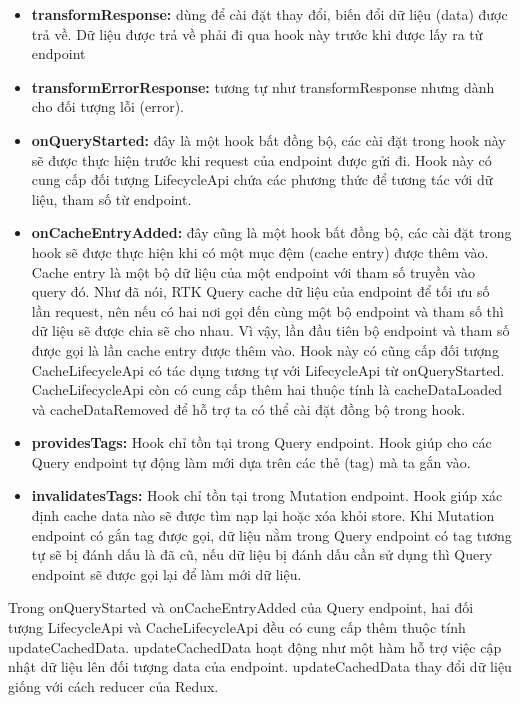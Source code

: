 \begin{itemize}
  \item \textbf{transformResponse:} dùng để cài đặt thay đổi, biến đổi dữ liệu (data) được trả về.
        Dữ liệu được trả về phải đi qua hook này trước khi được lấy ra từ endpoint
  \item \textbf{transformErrorResponse:} tương tự như transformResponse nhưng dành cho đối tượng lỗi (error).
  \item \textbf{onQueryStarted:} đây là một hook bất đồng bộ, các cài đặt trong hook này sẽ được thực hiện trước khi request của endpoint được gửi đi. Hook này có cung cấp đối tượng LifecycleApi chứa các phương thức để tương tác với dữ liệu, tham số từ endpoint.
  \item \textbf{onCacheEntryAdded:} đây cũng là một hook bất đồng bộ, các cài đặt trong hook sẽ được thực hiện khi có một mục đệm (cache entry) được thêm vào.
        Cache entry là một bộ dữ liệu của một endpoint với tham số truyền vào query đó.
        Như đã nói, RTK Query cache dữ liệu của endpoint để tối ưu số lần request, nên nếu có hai nơi gọi đến cùng một bộ endpoint và tham số thì dữ liệu sẽ được chia sẽ cho nhau.
        Vì vậy, lần đầu tiên bộ endpoint và tham số được gọi là lần cache entry được thêm vào.
        Hook này có cũng cấp đối tượng CacheLifecycleApi có tác dụng tương tự với LifecycleApi từ onQueryStarted.
        CacheLifecycleApi còn có cung cấp thêm hai thuộc tính là cacheDataLoaded và cacheDataRemoved để hỗ trợ ta có thể cài đặt đồng bộ trong hook.
  \item \textbf{providesTags:} Hook chỉ tồn tại trong Query endpoint.
        Hook giúp cho các Query endpoint tự động làm mới dựa trên các thẻ (tag) mà ta gắn vào.
  \item \textbf{invalidatesTags:} Hook chỉ tồn tại trong Mutation endpoint.
        Hook giúp xác định cache data nào sẽ được tìm nạp lại hoặc xóa khỏi store.
        Khi Mutation endpoint có gắn tag được gọi, dữ liệu nằm trong Query endpoint có tag tương tự sẽ bị đánh dấu là đã cũ, nếu dữ liệu bị đánh dấu cần sử dụng thì Query endpoint sẽ được gọi lại để làm mới dữ liệu.
\end{itemize}

Trong onQueryStarted và onCacheEntryAdded của Query endpoint, hai đối tượng LifecycleApi và CacheLifecycleApi đều có cung cấp thêm thuộc tính updateCachedData.
updateCachedData hoạt động như một hàm hỗ trợ việc cập nhật dữ liệu lên đối tượng data của endpoint.
updateCachedData thay đổi dữ liệu giống với cách reducer của Redux.
\par


